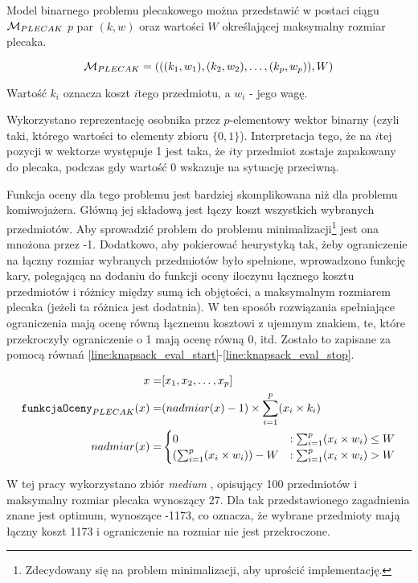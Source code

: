 \documentclass[./FM_mgr.tex]{subfiles}
\begin{document}
	Model binarnego problemu plecakowego można przedstawić w postaci ciągu $\mathcal{M}_{PLECAK}$ $p$ par $(k, w)$ oraz wartości $W$ określającej maksymalny rozmiar plecaka.
	
	\begin{displaymath}
	\mathcal{M}_{PLECAK} = ( ((k_1, w_1), (k_2, w_2), \ldots, (k_p, w_p)), W)
	\end{displaymath}
	
	Wartość $k_i$ oznacza koszt $i$tego przedmiotu, a $w_i$ - jego wagę.
	
	Wykorzystano reprezentację osobnika przez $p$-elementowy wektor binarny (czyli taki, którego wartości to elementy zbioru $\{0, 1\}$).
	Interpretacja tego, że na $i$tej pozycji w wektorze występuje 1 jest taka, że $i$ty przedmiot zostaje zapakowany do plecaka, podczas gdy wartość 0 wskazuje na sytuację przeciwną.
	
	Funkcja oceny dla tego problemu jest bardziej skomplikowana niż dla problemu komiwojażera. Główną jej składową jest łączy koszt wszystkich wybranych przedmiotów.
	Aby sprowadzić problem do problemu minimalizacji\footnote{
		Zdecydowany się na problem minimalizacji, aby uprościć implementację.
	} jest ona mnożona przez -1.
	Dodatkowo, aby pokierować heurystyką tak, żeby ograniczenie na łączny rozmiar wybranych przedmiotów było spełnione, wprowadzono funkcję kary, polegającą na dodaniu do funkcji oceny iloczynu łącznego kosztu przedmiotów i różnicy między sumą ich objętości, a maksymalnym rozmiarem plecaka (jeżeli ta różnica jest dodatnia).
	W ten sposób rozwiązania spełniające ograniczenia mają ocenę równą łącznemu kosztowi z ujemnym znakiem, te, które przekroczyły ograniczenie o 1 mają ocenę równą 0, itd.
	Zostało to zapisane za pomocą równań \ref{line:knapsack_eval_start}-\ref{line:knapsack_eval_stop}.
	
	\begin{align}
	\label{line:knapsack_eval_start}
	x = &[x_1, x_2, \ldots, x_p] \\
	\mathtt{funkcjaOceny}_{PLECAK}(x) = &(nadmiar(x)-1) \times \sum_{i=1}^{p} (x_i \times k_i) \\
	nadmiar(x) = &\begin{cases}
	0 &: \sum_{i=1}^{p} (x_i \times w_i) \leq W \\
	(\sum_{i=1}^{p} (x_i \times w_i)) - W &: \sum_{i=1}^{p} (x_i \times w_i) > W
	\end{cases}
	\label{line:knapsack_eval_stop}
	\end{align}
	
	W tej pracy wykorzystano zbiór \emph{medium} \cite{knapsack_data}, opisujący 100 przedmiotów i maksymalny rozmiar plecaka wynoszący 27.
	Dla tak przedstawionego zagadnienia znane jest optimum, wynoszące -1173, co oznacza, że wybrane przedmioty mają łączny koszt 1173 i ograniczenie na rozmiar nie jest przekroczone.
	
\end{document}
